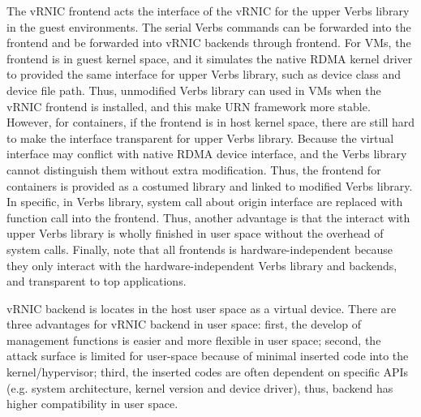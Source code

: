 The vRNIC frontend acts the interface of the vRNIC for the upper Verbs library in the guest environments. The serial Verbs commands can be forwarded into the frontend and be forwarded into vRNIC backends through frontend. For VMs, the frontend is in guest kernel space, and it simulates the native RDMA kernel driver to provided the same interface for upper Verbs library, such as device class and device file path. Thus, unmodified Verbs library can used in VMs when the vRNIC frontend is installed, and this make URN framework more stable. However, for containers, if the frontend is in host kernel space, there are still hard to make the interface transparent for upper Verbs library. Because the virtual interface may conflict with native RDMA device interface, and the Verbs library cannot distinguish them without extra modification. Thus, the frontend for containers is provided as a costumed library and linked to modified Verbs library. In specific, in Verbs library, system call about origin interface are replaced with function call into the frontend. Thus, another advantage is that the interact with upper Verbs library is wholly finished in user space without the overhead of system calls.  Finally, note that all frontends is hardware-independent because they only interact with the hardware-independent Verbs library and backends, and transparent to top applications.


vRNIC backend is locates in the host user space as a virtual device. There are three advantages for vRNIC backend in user space: first, the develop of management functions is easier and more flexible in user space; second, the attack surface is limited for user-space because of minimal inserted code into the kernel/hypervisor; third, the inserted codes are often dependent on specific APIs (e.g. system architecture, kernel version and device driver), thus, backend has higher compatibility in user space.


